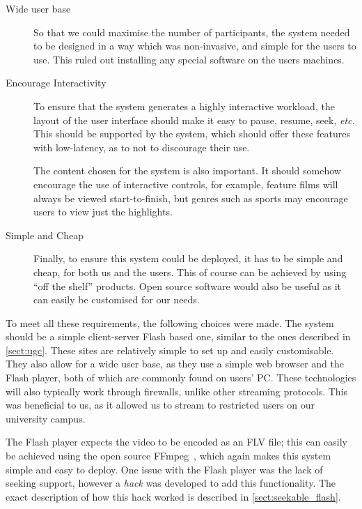 \begin{description}
  \item[Wide user base] So that we could maximise the number of participants, the system needed to be designed in a way which was non-invasive, and simple for the users to use. This ruled out installing any special software on the users machines.

  \item[Encourage Interactivity] To ensure that the system generates a highly interactive workload, the layout of the user interface should make it easy to pause, resume, seek, \emph{etc.} This should be supported by the system, which should offer these features with low-latency, as to not to discourage their use.

      The content chosen for the system is also important. It should somehow encourage the use of interactive controls, for example, feature films will always be viewed start-to-finish, but genres such as sports may encourage users to view just the highlights.

  \item[Simple and Cheap] Finally, to ensure this system could be deployed, it has to be simple and cheap, for both us and the users. This of course can be achieved by using ``off the shelf'' products. Open source software would also be useful as it can easily be customised for our needs.

\end{description}

To meet all these requirements, the following choices were made. The system should be a simple client-server Flash based one, similar to the ones described in \autoref{sect:ugc}. These sites are relatively simple to set up and easily customisable. They also allow for a wide user base, as they use a simple web browser and the Flash player, both of which are commonly found on users' PC. These technologies will also typically work through firewalls, unlike other streaming protocols. This was beneficial to us, as it allowed us to stream to restricted users on our university campus.

The Flash player expects the video to be encoded as an FLV file; this can easily be achieved using the open source FFmpeg~\cite{ffmpeg}, which again makes this system simple and easy to deploy. One issue with the Flash player was the lack of seeking support, however a \emph{hack} was developed to add this functionality. The exact description of how this hack worked is described in \autoref{sect:seekable_flash}.

